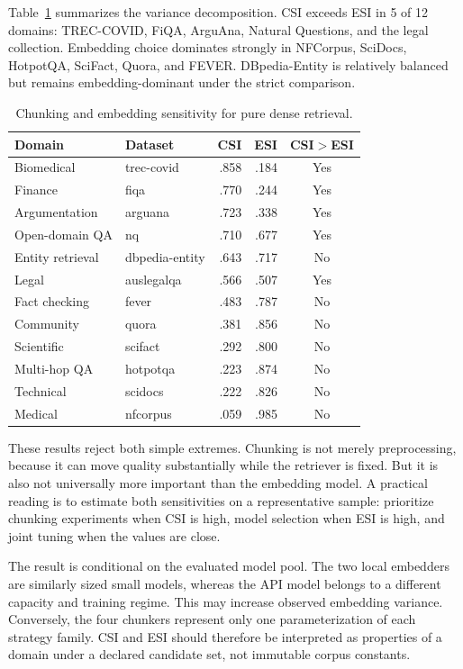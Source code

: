 \documentclass[10pt,letterpaper]{article}
\begin{document}
Table~\ref{tab:csi} summarizes the variance decomposition. CSI exceeds ESI in 5 of 12 domains:
TREC-COVID, FiQA, ArguAna, Natural Questions, and the legal collection. Embedding choice dominates
strongly in NFCorpus, SciDocs, HotpotQA, SciFact, Quora, and FEVER. DBpedia-Entity is relatively
balanced but remains embedding-dominant under the strict comparison.

\begin{table}[t]
\centering
\caption{Chunking and embedding sensitivity for pure dense retrieval.}
\label{tab:csi}
\small
\begin{tabular}{llrrc}
\toprule
Domain & Dataset & CSI & ESI & CSI$>$ESI \\
\midrule
Biomedical & trec-covid & .858 & .184 & Yes \\
Finance & fiqa & .770 & .244 & Yes \\
Argumentation & arguana & .723 & .338 & Yes \\
Open-domain QA & nq & .710 & .677 & Yes \\
Entity retrieval & dbpedia-entity & .643 & .717 & No \\
Legal & auslegalqa & .566 & .507 & Yes \\
Fact checking & fever & .483 & .787 & No \\
Community & quora & .381 & .856 & No \\
Scientific & scifact & .292 & .800 & No \\
Multi-hop QA & hotpotqa & .223 & .874 & No \\
Technical & scidocs & .222 & .826 & No \\
Medical & nfcorpus & .059 & .985 & No \\
\bottomrule
\end{tabular}
\end{table}

These results reject both simple extremes. Chunking is not merely preprocessing, because it can
move quality substantially while the retriever is fixed. But it is also not universally more important
than the embedding model. A practical reading is to estimate both sensitivities on a representative
sample: prioritize chunking experiments when CSI is high, model selection when ESI is high, and
joint tuning when the values are close.

The result is conditional on the evaluated model pool. The two local embedders are similarly sized
small models, whereas the API model belongs to a different capacity and training regime. This may
increase observed embedding variance. Conversely, the four chunkers represent only one
parameterization of each strategy family. CSI and ESI should therefore be interpreted as properties
of a domain under a declared candidate set, not immutable corpus constants.
\end{document}
